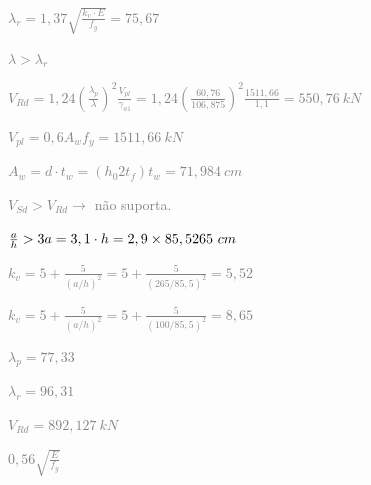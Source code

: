 \begin{enumerate}
    \textcolor{gray}{$\lambda_r = 1,37 \sqrt{\frac{k_v \cdot E}{f_y}} = 75,67$}

    \textcolor{gray}{$\lambda > \lambda_r$}

    \textcolor{gray}{$V_{Rd} = 1,24 (\frac{\lambda_p}{\lambda})^2 \frac{V_{pl}}{\gamma_{a1}} = 1,24 (\frac{60,76}{106,875})^2 \frac{1511,66}{1,1} = 550,76 \ kN$}

    \textcolor{gray}{$V_{pl} = 0,6 A_w f_y = 1511,66 \ kN$}

    \textcolor{gray}{$A_w = d \cdot t_w = (h_0 2t_f)t_w = 71,984 \ cm$}

    \textcolor{gray}{$V_{Sd} > V_{Rd} \to$ não suporta.}

    \textcolor{gray}{$\frac{a}{h}>3 \newline a = 3,1 \cdot h = 2,9 \times 85,5 \newline 265 \ cm$}

    \textcolor{gray}{$k_v = 5+\frac{5}{(a/h)^2} = 5 + \frac{5}{(265/85,5)^2} = 5,52$}

    \textcolor{gray}{$k_v = 5+\frac{5}{(a/h)^2} = 5 + \frac{5}{(100/85,5)^2} = 8,65$}

    \textcolor{gray}{$\lambda_p = 77,33$}

    \textcolor{gray}{$\lambda_r = 96,31$}

    \textcolor{gray}{$V_{Rd} = 892,127 \ kN$}

    \textcolor{gray}{$0,56 \sqrt{\frac{E}{f_y}}$}

\end{enumerate}